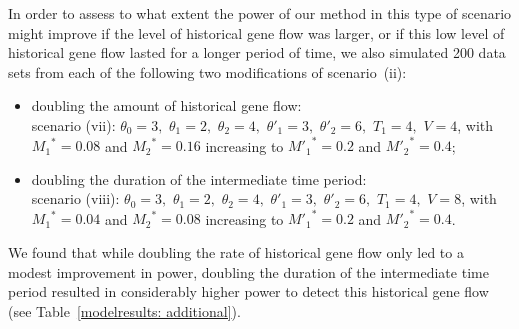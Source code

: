 \documentclass[11pt]{article}
\begin{document}
In order to assess to what extent the power of our method in this type of scenario might improve if the level of historical gene flow was larger, or if this low level of historical gene flow lasted for a longer period of time, we also simulated 200 data sets from each of %
the following two modifications of scenario~(ii):
\begin{itemize}
\item doubling the amount of historical gene flow: \\
scenario (vii): 
$\theta_0=3,\,\, \theta_1=2,\,\, \theta_2=4,\,\, \theta'_1=3,\,\, \theta'_2=6,\,\, T_1=4,\,\, V=4$, with ${M_1}^{\!*}=0.08$ and ${M_2}^{\!*}=0.16$ increasing to
${M'_1}^{*}=0.2$ and ${M'_2}^{*}=0.4$;
\item doubling the duration of the intermediate time period:\\
scenario (viii): 
$\theta_0=3,\,\, \theta_1=2,\,\, \theta_2=4,\,\, \theta'_1=3,\,\, \theta'_2=6,\,\, T_1=4,\,\, V=8$, with ${M_1}^{\!*}=0.04$ and ${M_2}^{\!*}=0.08$ increasing to ${M'_1}^{*}=0.2$ and ${M'_2}^{*}=0.4$.
\end{itemize}
We found that while doubling the rate of historical gene flow only led to a modest improvement in power, doubling the duration of the intermediate time period resulted in considerably higher power to detect this historical gene flow (see Table~\ref{modelresults: additional}).
\end{document}
